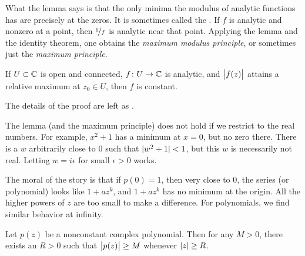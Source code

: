 What the lemma
says is that the only minima the modulus of analytic functions
has are precisely at the zeros.
It is sometimes called the \emph{}.
If $f$ is analytic and nonzero at a point,
then $\nicefrac{1}{f}$ is analytic near that point.  Applying the lemma and
the identity theorem, one obtains the \emph{maximum modulus principle}, or sometimes
just the \emph{maximum principle}.

\begin{thm}%
%
\label{thm:maxprinciple}
If $U \subset {\mathbb{C}}$ is open and connected,
$f \colon U \to {\mathbb{C}}$ is analytic, and $\bigl\lvert {f(z)} \bigr\rvert$ attains a relative
maximum at $z_0 \in U$, then $f$ is constant.
\end{thm}

The details of the proof are left as .

\begin{remark}
The lemma (and the maximum principle) does not hold if we restrict to the real numbers.  For
example, $x^2+1$ has a minimum at $x=0$, but no zero there.
There is a $w$ arbitrarily close to $0$ such that $\lvert {w^2+1} \rvert < 1$, but this
$w$ is necessarily not real.  Letting $w = i\epsilon$ for small
$\epsilon > 0$ works.
\end{remark}

The moral of the story is that if $p(0) = 1$, then very close to 0, the
series (or polynomial)
looks like $1+az^k$, and $1+az^k$ has no minimum at the origin.  All the higher
powers of $z$ are too small to make a difference.  For polynomials, we find similar behavior
at infinity.

\begin{lemma}
Let $p(z)$ be a nonconstant complex polynomial.  Then for any $M > 0$, there exists
an $R > 0$ such that
$\bigl\lvert {p(z)} \bigr\rvert \geq M$ whenever $\lvert {z} \rvert \geq R$.
\end{lemma}

